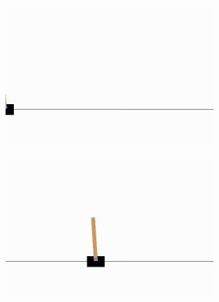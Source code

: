 \documentclass[
  letterpaper,
  DIV=11,
  numbers=noendperiod,
  oneside]{scrartcl}
\begin{document}
\begin{figure}
\begin{minipage}{0.50\linewidth}
\begin{figure}[H]
{}


\end{figure}%

\end{minipage}%
\newline
\begin{minipage}{0.50\linewidth}

\begin{figure}[H]

{\centering \includegraphics[width=3.125in,height=\textheight]{videos/dqn/episode-8159.gif}

}


\end{figure}%

\end{minipage}%
%
\begin{minipage}{0.50\linewidth}

\begin{figure}[H]

{\centering \includegraphics[width=3.125in,height=\textheight]{videos/dqn/episode-8358.gif}

}


\end{figure}%

\end{minipage}%

\end{figure}%
\end{document}
